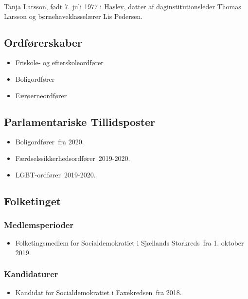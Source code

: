 \documentclass[11pt, a4paper]{awesome-cv}
\begin{document}
\makecvheader[R]
\makelettertitle
\begin{cvletter}
Tanja Larsson, født 7. juli 1977 i Haslev, datter af daginstitutionsleder Thomas Larsson og børnehaveklasselærer Lis Pedersen.

\subsection*{Ordførerskaber}
\begin{itemize}
\item Friskole- og efterskoleordfører
\item Boligordfører
\item Færøerneordfører
\end{itemize}
\subsection*{Parlamentariske Tillidsposter}
\begin{itemize}
\item Boligordfører fra 2020.
\item Færdselssikkerhedsordfører 2019-2020.
\item LGBT-ordfører 2019-2020.
\end{itemize}
\subsection*{Folketinget}
\subsubsection*{Medlemsperioder}
\begin{itemize}
\item Folketingsmedlem for Socialdemokratiet i Sjællands Storkreds fra 1. oktober 2019.
\end{itemize}
\subsubsection*{Kandidaturer}
\begin{itemize}
\item Kandidat for Socialdemokratiet i Faxekredsen fra 2018.
\end{itemize}
\end{cvletter}
\end{document}
